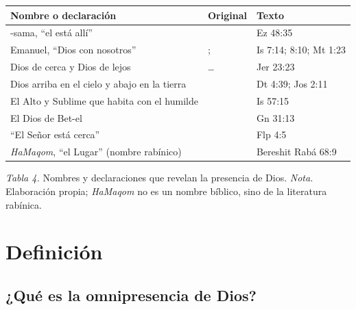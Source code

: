 \begin{center}\small\renewcommand{\arraystretch}{1.2}
\begin{tabular}{@{}L{4.6cm}L{5.0cm}L{4.4cm}@{}}
\toprule
\textbf{Nombre o declaración} & \textbf{Original} & \textbf{Texto} \\ \midrule
\SENOR{}-sama, ``el \SENOR{} está allí'' &  & Ez 48:35 \\
Emanuel, ``Dios con nosotros'' & ;  & Is 7:14; 8:10; Mt 1:23 \\
Dios de cerca y Dios de lejos & \ldots{}  & Jer 23:23 \\
Dios arriba en el cielo y abajo en la tierra &  & Dt 4:39; Jos 2:11 \\
El Alto y Sublime que habita con el humilde &  & Is 57:15 \\
El Dios de Bet-el &  & Gn 31:13 \\
``El Señor está cerca'' &  & Flp 4:5 \\
\emph{HaMaqom}, ``el Lugar'' (nombre rabínico) &  & Bereshit Rabá 68:9 \\
\bottomrule
\end{tabular}\par
{\footnotesize\color{gris}\textit{Tabla 4.} Nombres y declaraciones que revelan la presencia de Dios. \textit{Nota.} Elaboración propia; \emph{HaMaqom} no es un nombre bíblico, sino de la literatura rabínica.}
\end{center}


\section{Definición}

\subsection{¿Qué es la omnipresencia de Dios?}

